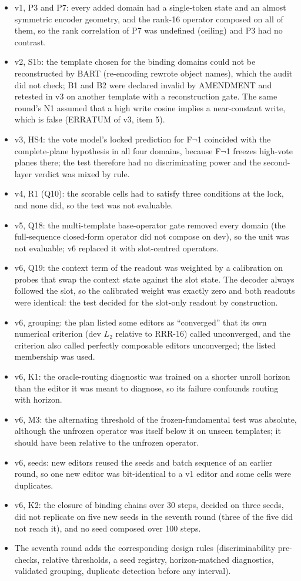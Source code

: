 \begin{itemize}
\item v1, P3 and P7: every added domain had a single-token state and an almost symmetric encoder geometry, and the rank-16 operator
composed on all of them, so the rank correlation of P7 was undefined (ceiling) and P3 had no contrast.
\item v2, S1b: the template chosen for the binding domains could not be reconstructed by BART (re-encoding rewrote object names), which
the audit did not check; B1 and B2 were declared invalid by AMENDMENT and retested in v3 on another template with a reconstruction gate.
The same round's N1 assumed that a high write cosine implies a near-constant write, which is false (ERRATUM of v3, item 5).
\item v3, HS4: the vote model's locked prediction for F$\neg$1 coincided with the complete-plane hypothesis in all four domains, because
F$\neg$1 freezes high-vote planes there; the test therefore had no discriminating power and the second-layer verdict was mixed by rule.
\item v4, R1 (Q10): the scorable cells had to satisfy three conditions at the lock, and none did, so the test was not evaluable.
\item v5, Q18: the multi-template base-operator gate removed every domain (the full-sequence closed-form operator did not compose on
dev), so the unit was not evaluable; v6 replaced it with slot-centred operators.
\item v6, Q19: the context term of the readout was weighted by a calibration on probes that swap the context state against the slot
state. The decoder always followed the slot, so the calibrated weight was exactly zero and both readouts were identical: the test
decided for the slot-only readout by construction.
\item v6, grouping: the plan listed some editors as ``converged'' that its own numerical criterion (dev $L_2$ relative to RRR-16)
called unconverged, and the criterion also called perfectly composable editors unconverged; the listed membership was used.
\item v6, K1: the oracle-routing diagnostic was trained on a shorter unroll horizon than the editor it was meant to diagnose, so its
failure confounds routing with horizon.
\item v6, M3: the alternating threshold of the frozen-fundamental test was absolute, although the unfrozen operator was itself below
it on unseen templates; it should have been relative to the unfrozen operator.
\item v6, seeds: new editors reused the seeds and batch sequence of an earlier round, so one new editor was bit-identical to a v1 editor
and some cells were duplicates.
\item v6, K2: the closure of binding chains over 30 steps, decided on three seeds, did not replicate on five new seeds in the seventh
round (three of the five did not reach it), and no seed composed over 100 steps.
\item The seventh round adds the corresponding design rules (discriminability pre-checks, relative thresholds, a seed registry,
horizon-matched diagnostics, validated grouping, duplicate detection before any interval).


\end{itemize}

